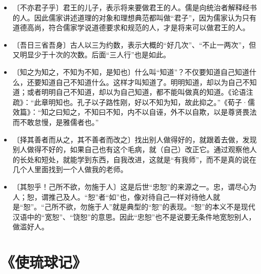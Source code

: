 \documentclass[12pt,UTF-8,openany]{ctexbook}
\begin{document}
\begin{itemize}
    \setlength\itemsep{-0.2em}
    \item〔不亦君子乎〕君王的儿子，表示将来要做君王的人。儒是向统治者解释经书的人。因此儒家讲述道理的对象和理想典范都叫做“君子”，因为儒家认为只有道德高尚，符合儒家学说道德要求和规范的人，才是将来可以做君王的人。
    \item〔吾日三省吾身〕古人以三为约数，表示大概的“好几次”、“不止一两次”，但又明显少于十次的次数。后面“三人行”也是如此。
    \item〔知之为知之，不知为不知，是知也〕什么叫“知道”？不仅要知道自己知道什么，还要知道自己不知道什么。这样才叫知道了。明明知道，却以为自己不知道；或者明明自己不知道，却以为自己知道，都不能叫做真的知道。《论语注疏》：“此章明知也。孔子以子路性刚，好以不知为知，故此抑之。”《荀子·儒效篇》：“知之曰知之，不知曰不知，内不以自诬，外不以自欺，以是尊贤畏法而不敢怠慢，是雅儒者也。”
    \item〔择其善者而从之，其不善者而改之〕找出别人做得好的，就跟着去做，发现别人做得不好的，如果自己也有这个毛病，就（自己）改正它。通过观察他人的长处和短处，就能学到东西，自我改进，这就是“有我师”，而不是真的说在几个人里面找到一个人做我的老师。
    \item〔其恕乎！己所不欲，勿施于人〕这是后世“忠恕”的来源之一。忠，谓尽心为人；恕，谓推己及人。“恕”者“如”也，像对待自己一样对待他人就是“恕”。“己所不欲，勿施于人”就是典型的“恕”的表现。“恕”的本义不是现代汉语中的“宽恕”、“饶恕”的意思。因此“忠恕”也不是说要无条件地宽恕别人，做滥好人。
\end{itemize}

\chapter{《使琉球记》}
\end{document}
